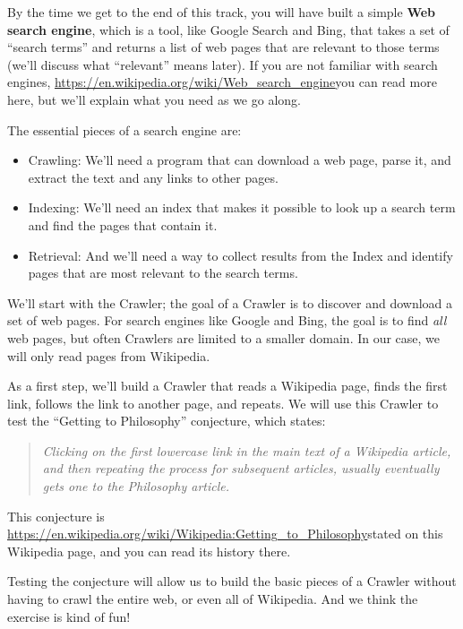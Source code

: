 \documentclass[12pt]{book}
\theoremstyle{exercise}
\begin{document}
{By the time we get to the end of this track, you will have built a
simple \textbf{Web search engine}, which is a tool, like Google Search
and Bing, that takes a set of ``search terms'' and returns a list of web
pages that are relevant to those terms (we'll discuss what ``relevant''
means later). If you are not familiar with search engines,
\url{https://en.wikipedia.org/wiki/Web_search_engine}{you can read more
here}, but we'll explain what you need as we go along.

The essential pieces of a search engine are:

\begin{itemize}
\item
  Crawling: We'll need a program that can download a web page, parse it,
  and extract the text and any links to other pages.
\item
  Indexing: We'll need an index that makes it possible to look up a
  search term and find the pages that contain it.
\item
  Retrieval: And we'll need a way to collect results from the Index and
  identify pages that are most relevant to the search terms.
\end{itemize}

We'll start with the Crawler; the goal of a Crawler is to discover and
download a set of web pages. For search engines like Google and Bing,
the goal is to find \emph{all} web pages, but often Crawlers are limited
to a smaller domain. In our case, we will only read pages from
Wikipedia.

As a first step, we'll build a Crawler that reads a Wikipedia page,
finds the first link, follows the link to another page, and repeats. We
will use this Crawler to test the ``Getting to Philosophy'' conjecture,
which states:

\begin{quote}
\emph{Clicking on the first lowercase link in the main text of a
Wikipedia article, and then repeating the process for subsequent
articles, usually eventually gets one to the Philosophy article.}
\end{quote}

This conjecture is
\url{https://en.wikipedia.org/wiki/Wikipedia:Getting_to_Philosophy}{stated
on this Wikipedia page}, and you can read its history there.

Testing the conjecture will allow us to build the basic pieces of a
Crawler without having to crawl the entire web, or even all of
Wikipedia. And we think the exercise is kind of fun!

}
\end{document}
